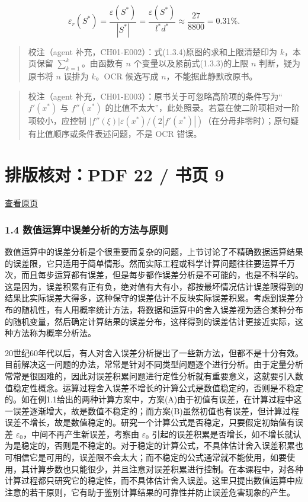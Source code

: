 \documentclass[
  10pt,
  a4paper,
]{article}
\begin{document}
\[
\varepsilon_r(S^*)=\frac{\varepsilon(S^*)}{|S^*|}=\frac{\varepsilon(S^*)}{l^*d^*}\approx\frac{27}{8800}=0.31\%.
\]

\begin{quote}
校注（agent 补充，CH01-E002）：式(1.3.4)原图的求和上限清楚印为
\(k\)，本页保留 \(\sum_{k=1}^{k}\)。由函数有 \(n\)
个变量以及紧前式(1.3.3)的上限 \(n\) 判断，疑为原书将 \(n\) 误排为
\(k\)。OCR 候选写成 \(n\)，不能据此静默改原书。
\end{quote}

\begin{quote}
校注（agent
补充，CH01-E003）：原书关于可忽略高阶项的条件写为``\(f'(x^*)\) 与
\(f''(x^*)\)
的比值不太大''，此处照录。若意在使二阶项相对一阶项较小，应控制
\(|f''(\xi)|\varepsilon(x^*)/(2|f'(x^*)|)\)（在分母非零时）；原句疑有比值顺序或条件表述问题，不是
OCR 错误。
\end{quote}

\newpage

\section{排版核对：PDF 22 / 书页
9}\label{ux6392ux7248ux6838ux5bf9pdf-22-ux4e66ux9875-9}

\href{../../../source-images/pdf-022.jpeg}{查看原页}

\subsubsection{1.4
数值运算中误差分析的方法与原则}\label{ux6570ux503cux8fd0ux7b97ux4e2dux8befux5deeux5206ux6790ux7684ux65b9ux6cd5ux4e0eux539fux5219}

数值运算中的误差分析是个很重要而复杂的问题，上节讨论了不精确数据运算结果的误差限，它只适用于简单情形。然而实际工程或科学计算问题往往要运算千万次，而且每步运算都有误差，但是每步都作误差分析是不可能的，也是不科学的。这是因为，误差积累有正有负，绝对值有大有小，都按最坏情况估计误差限得到的结果比实际误差大得多，这种保守的误差估计不反映实际误差积累。考虑到误差分布的随机性，有人用概率统计方法，将数据和运算中的舍入误差视为适合某种分布的随机变量，然后确定计算结果的误差分布，这样得到的误差估计更接近实际，这种方法称为概率分析法。

20世纪60年代以后，有人对舍入误差分析提出了一些新方法，但都不是十分有效。目前解决这一问题的办法，常常是针对不同类型问题逐个进行分析。由于定量分析常常是很困难的，因此对误差积累问题进行定性分析就有重要意义，这就要引入数值稳定性概念。运算过程舍入误差不增长的计算公式是数值稳定的，否则是不稳定的。如在例1.1给出的两种计算方案中，方案(A)由于初值有误差，在计算过程中这一误差逐渐增大，故是数值不稳定的；而方案(B)虽然初值也有误差，但计算过程误差不增长，故是数值稳定的。研究一个计算公式是否稳定，只要假定初始值有误差
\(\varepsilon_0\)，中间不再产生新误差，考察由 \(\varepsilon_0\)
引起的误差积累是否增长，如不增长就认为是稳定的，否则是不稳定的。对于稳定的计算公式，不具体估计舍入误差积累也可相信它是可用的，误差限不会太大；而不稳定的公式通常就不能使用，如要使用，其计算步数也只能很少，并且注意对误差积累进行控制。在本课程中，对各种计算过程都只研究它的稳定性，而不具体估计舍入误差。这里只提出数值运算中应注意的若干原则，它有助于鉴别计算结果的可靠性并防止误差危害现象的产生。
\end{document}
